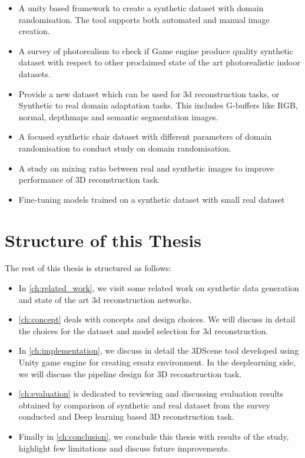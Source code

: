 \begin{itemize}
    \item A unity based framework to create a synthetic dataset with domain randomisation.
    The tool supports both automated and manual image creation.
    \item A survey of photorealism to check if Game engine produce quality synthetic dataset with respect to other proclaimed state of the art photorealistic indoor datasets.
    \item Provide a new dataset which can be used for 3d reconstruction tasks, or Synthetic to real domain adaptation tasks.
    This includes G-buffers like RGB, normal, depthmaps and semantic segmentation images.
    \item A focused synthetic chair dataset with different parameters of domain randomisation to conduct study on domain randomisation.
    \item A study on mixing ratio between real and synthetic images to improve performance of 3D reconstruction task.
    \item Fine-tuning models trained on a synthetic dataset with small real dataset
\end{itemize}


\section{Structure of this Thesis}\label{sec:Structure of thesis}

The rest of this thesis is structured as follows:

\begin{itemize}
    \item In \autoref{ch:related_work}, we visit some related work on synthetic data generation and state of the art 3d reconstruction networks.
    \item \autoref{ch:concept} deals with concepts and design choices.
    We will discuss in detail the choices for the dataset and model selection for 3d reconstruction.
    \item In \autoref{ch:implementation}, we discuss in detail the 3DScene tool developed using Unity game engine for creating ersatz environment.
    In the deeplearning side, we will discuss the pipeline design for 3D reconstruction task.
    \item \autoref{ch:evaluation} is dedicated to reviewing and discussing evaluation results obtained by comparison of synthetic and real dataset from the survey conducted and Deep learning based 3D reconstruction task.
    \item Finally in \autoref{ch:conclusion}, we conclude this thesis with results of the study, highlight few limitations and discuss future improvements.
\end{itemize}